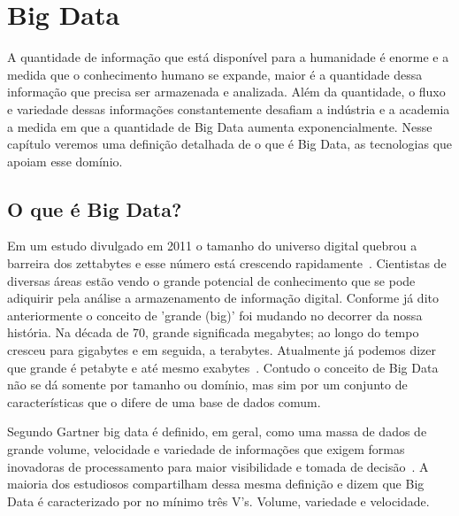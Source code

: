 \chapter{Big Data}


A quantidade de informação que está disponível para a humanidade é enorme e a medida que o conhecimento humano se expande, maior é a quantidade dessa informação que precisa ser armazenada e analizada. Além da quantidade, o fluxo e variedade dessas informações constantemente desafiam a indústria e a academia a medida em que a quantidade de Big Data aumenta exponencialmente. Nesse capítulo veremos uma definição detalhada de o que é Big Data, as tecnologias que apoiam esse domínio.

\section{O que é Big Data?}

Em um estudo divulgado em 2011 o tamanho do universo digital quebrou a barreira dos zettabytes e esse número está crescendo rapidamente~\cite{emcuniversedigital}. Cientistas de diversas áreas estão vendo o grande potencial de conhecimento que se pode adiquirir pela análise a armazenamento de informação digital. Conforme já dito anteriormente o conceito de 'grande (big)'  foi mudando no decorrer da nossa história. Na década de 70, grande significada megabytes; ao longo do tempo cresceu para gigabytes e em seguida, a terabytes. Atualmente já podemos dizer que grande é petabyte e até mesmo exabytes~\cite{WNextBigData}. Contudo  o  conceito de Big Data não se dá somente por tamanho ou domínio, mas sim por um conjunto de características que o difere de uma base de dados comum.

Segundo Gartner big data é definido, em geral, como uma massa de dados de grande volume, velocidade e variedade de informações que exigem formas inovadoras de processamento para maior visibilidade e tomada de decisão~\cite{conceitoGartner}. A maioria dos estudiosos compartilham dessa mesma definição e dizem que Big Data é caracterizado por no mínimo três V's. Volume, variedade e  velocidade.~\cite{ibmbigdatavvv,fromdbtobigdata}


